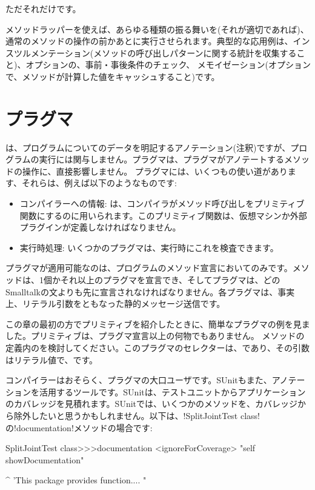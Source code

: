 \documentclass[a4paper,10pt,twoside]{book}
\begin{document}
ただそれだけです。

メソッドラッパーを使えば、あらゆる種類の振る舞いを(それが適切であれば)、通常のメソッドの操作の前かあとに実行させられます。典型的な応用例は、インスツルメンテーション(メソッドの呼び出しパターンに関する統計を収集すること)、オプションの、事前・事後条件のチェック、 メモイゼーション(オプションで、メソッドが計算した値をキャッシュすること)です。

\section{プラグマ}

は、プログラムについてのデータを明記するアノテーション(注釈)ですが、プログラムの実行には関与しません。プラグマは、プラグマがアノテートするメソッドの操作に、直接影響しません。
プラグマには、いくつもの使い道があります、それらは、例えば以下のようなものです:
\begin{itemize}
\item コンパイラーへの情報: は、コンパイラがメソッド呼び出しをプリミティブ関数にするのに用いられます。このプリミティブ関数は、仮想マシンか外部プラグインが定義しなければなりません。
\item 実行時処理: いくつかのプラグマは、実行時にこれを検査できます。 %
\end{itemize}

プラグマが適用可能なのは、プログラムのメソッド宣言においてのみです。メソッドは、1個かそれ以上のプラグマを宣言でき、そしてプラグマは、どのSmalltalkの文よりも先に宣言されなければなりません。各プラグマは、事実上、リテラル引数をともなった静的メッセージ送信です。

この章の最初の方でプリミティブを紹介したときに、簡単なプラグマの例を見ました。プリミティブは、プラグマ宣言以上の何物でもありません。 
メソッドの定義内のを検討してください。このプラグマのセレクターは、であり、その引数はリテラル値で、です。 %

コンパイラーはおそらく、プラグマの大口ユーザです。SUnitもまた、アノテーションを活用するツールです。SUnitは、テストユニットからアプリケーションのカバレッジを見積れます。SUnitでは、いくつかのメソッドを、カバレッジから除外したいと思うかもしれません。以下は、\ct!SplitJointTest class!の\ct!documentation!メソッドの場合です:

\begin{code}{}
SplitJointTest class>>>documentation
	<ignoreForCoverage>
	"self showDocumentation"
	
	^ 'This package provides function.... "
\end{code}
\end{document}
